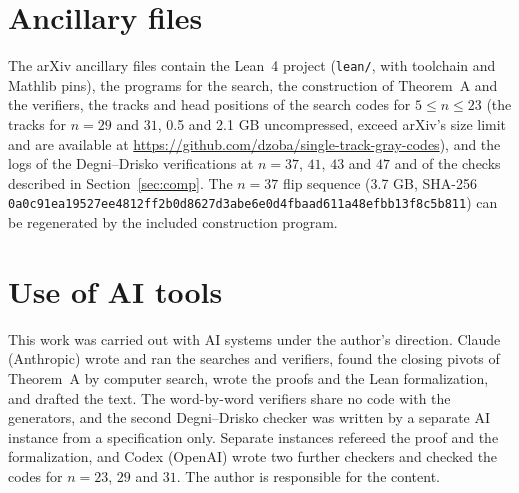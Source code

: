 \documentclass[11pt]{article}
\begin{document}
\section*{Ancillary files}
The arXiv ancillary files contain the Lean~4 project (\texttt{lean/}, with toolchain and Mathlib pins), the programs
for the search, the construction of Theorem~A and the verifiers, the tracks and head positions of the search codes for
$5\le n\le 23$ (the tracks for $n=29$ and $31$, 0.5 and 2.1 GB uncompressed, exceed arXiv's size limit and are
available at \url{https://github.com/dzoba/single-track-gray-codes}), and the logs of the Degni--Drisko verifications at $n=37$, $41$, $43$ and $47$ and of the checks
described in Section~\ref{sec:comp}. The $n=37$ flip sequence (3.7 GB, SHA-256
\texttt{0a0c91ea19527ee4812ff2b0d8627d3a\allowbreak be6e0d4fbaad611a48efbb13f8c5b811}) can be regenerated by the included
construction program.

\section*{Use of AI tools}
This work was carried out with AI systems under the author's direction. Claude (Anthropic) wrote and ran the searches
and verifiers, found the closing pivots of Theorem~A by computer search, wrote the proofs and the Lean formalization,
and drafted the text. The word-by-word verifiers share no code with the generators, and the second
Degni--Drisko checker was written by a separate AI instance from a specification only. Separate instances refereed the
proof and the formalization, and Codex (OpenAI) wrote two further checkers and checked the codes for $n=23$, $29$ and
$31$. The author
is responsible for the content.
\end{document}
